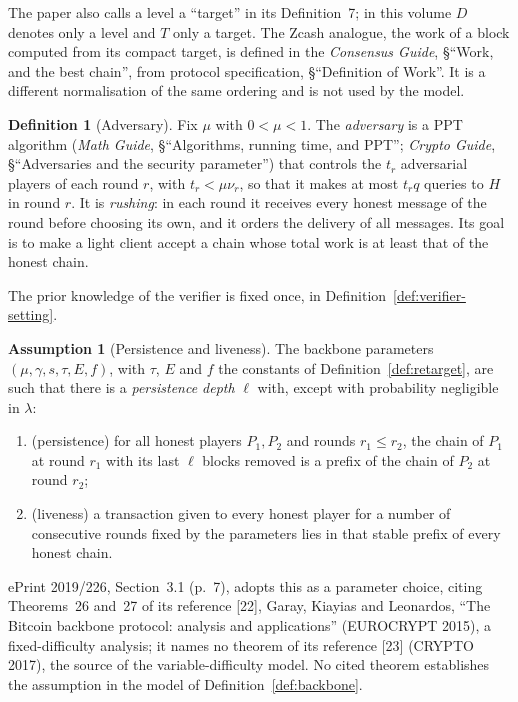 \documentclass[11pt,a4paper]{article}
\theoremstyle{definition}
\newtheorem{definition}[theorem]{Definition}
\newtheorem{assumption}[theorem]{Assumption}
\begin{document}
The paper also calls a level a ``target'' in its Definition~7; in this volume
$D$ denotes only a level and $T$ only a target. The Zcash analogue, the work
of a block computed from its compact target, is defined in the
\emph{Consensus Guide}, \S``Work, and the best chain'', from protocol
specification, \S``Definition of Work''. It is a different normalisation of
the same ordering and is not used by the model.

\begin{definition}[Adversary]\label{def:adversary}
Fix $\mu$ with $0 < \mu < 1$. The \emph{adversary} is a PPT algorithm
(\emph{Math Guide}, \S``Algorithms, running time, and PPT''; \emph{Crypto
Guide}, \S``Adversaries and the security parameter'') that controls the $t_r$
adversarial players of each round $r$, with $t_r < \mu \nu_r$, so that it
makes at most $t_r q$ queries to $H$ in round $r$. It is \emph{rushing}: in
each round it receives every honest message of the round before choosing its
own, and it orders the delivery of all messages. Its goal is to make a light
client accept a chain whose total work is at least that of the honest chain.
\end{definition}

The prior knowledge of the verifier is fixed once, in
Definition~\ref{def:verifier-setting}.

\begin{assumption}[Persistence and liveness]\label{ass:persistence}
The backbone parameters $(\mu, \gamma, s, \tau, E, f)$, with $\tau$, $E$
and $f$ the constants of Definition~\ref{def:retarget}, are such that there
is a \emph{persistence depth} $\ell$ with, except with probability negligible
in $\lambda$:
\begin{enumerate}
\item (persistence) for all honest players $P_1, P_2$ and rounds
  $r_1 \le r_2$, the chain of $P_1$ at round $r_1$ with its last $\ell$
  blocks removed is a prefix of the chain of $P_2$ at round $r_2$;
\item (liveness) a transaction given to every honest player for a number of
  consecutive rounds fixed by the parameters lies in that stable prefix of
  every honest chain.
\end{enumerate}
\end{assumption}

ePrint 2019/226, Section~3.1 (p.~7), adopts this as a parameter choice,
citing Theorems~26 and~27 of its reference [22], Garay, Kiayias and
Leonardos, ``The Bitcoin backbone protocol: analysis and applications''
(EUROCRYPT 2015), a fixed-difficulty analysis; it names no theorem of its
reference [23] (CRYPTO 2017), the source of the variable-difficulty model.
No cited theorem establishes the assumption in the model of
Definition~\ref{def:backbone}.
\end{document}

